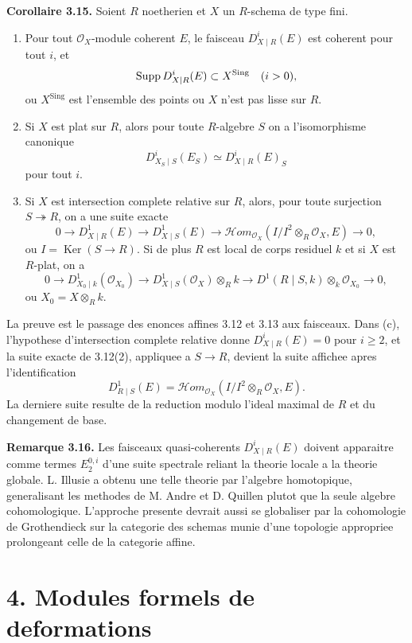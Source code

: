\documentclass[11pt]{article}
\providecommand{\Ker}{\operatorname{Ker}}
\begin{document}
\textbf{Corollaire 3.15.} Soient \(R\) noetherien et \(X\) un \(R\)-schema de type fini.
\begin{enumerate}[label=(\alph*)]
\item Pour tout \(\mathcal O_X\)-module coherent \(E\), le faisceau \(D^i_{X\mid R}(E)\) est coherent pour tout \(i\), et
\[
 \operatorname{Supp} D^i_{X\mid R}(E)\subset X^{\mathrm{Sing}}
 \quad (i>0),
\]
ou \(X^{\mathrm{Sing}}\) est l'ensemble des points ou \(X\) n'est pas lisse sur \(R\).
\item Si \(X\) est plat sur \(R\), alors pour toute \(R\)-algebre \(S\) on a l'isomorphisme canonique
\[
 D^i_{X_S\mid S}(E_S)\simeq D^i_{X\mid R}(E)_S
\]
pour tout \(i\).
\item Si \(X\) est intersection complete relative sur \(R\), alors, pour toute surjection \(S\twoheadrightarrow R\), on a une suite exacte
\[
 0\to D^1_{X\mid R}(E)\to D^1_{X\mid S}(E)
 \to \mathcal Hom_{\mathcal O_X}(I/I^2\otimes_R\mathcal O_X,E)\to 0,
\]
ou \(I=\Ker(S\to R)\). Si de plus \(R\) est local de corps residuel \(k\) et si \(X\) est \(R\)-plat, on a
\[
 0\to D^1_{X_0\mid k}(\mathcal O_{X_0})\to
 D^1_{X\mid S}(\mathcal O_X)\otimes_R k
 \to D^1(R\mid S,k)\otimes_k\mathcal O_{X_0}\to 0,
\]
ou \(X_0=X\otimes_R k\).
\end{enumerate}
La preuve est le passage des enonces affines 3.12 et 3.13 aux faisceaux. Dans (c), l'hypothese d'intersection complete relative donne \(D^i_{X\mid R}(E)=0\) pour \(i\geq 2\), et la suite exacte de 3.12(2), appliquee a \(S\to R\), devient la suite affichee apres l'identification
\[
 D^1_{R\mid S}(E)=\mathcal Hom_{\mathcal O_X}(I/I^2\otimes_R\mathcal O_X,E).
\]
La derniere suite resulte de la reduction modulo l'ideal maximal de \(R\) et du changement de base.

\textbf{Remarque 3.16.} Les faisceaux quasi-coherents \(D^i_{X\mid R}(E)\) doivent apparaitre comme termes \(E^{0,i}_2\) d'une suite spectrale reliant la theorie locale a la theorie globale. L. Illusie a obtenu une telle theorie par l'algebre homotopique, generalisant les methodes de M. Andre et D. Quillen plutot que la seule algebre cohomologique. L'approche presente devrait aussi se globaliser par la cohomologie de Grothendieck sur la categorie des schemas munie d'une topologie appropriee prolongeant celle de la categorie affine.

\section*{4. Modules formels de deformations}
\end{document}
